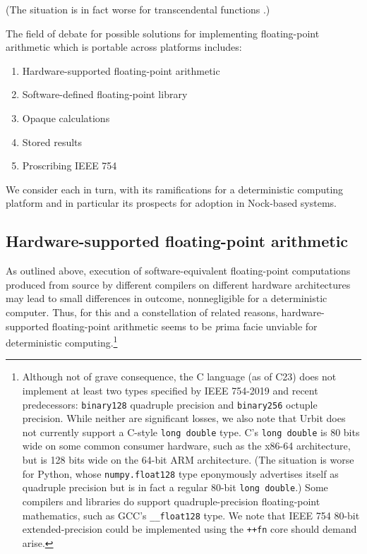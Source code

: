 \documentclass[twoside]{article}
\begin{document}
(The situation is in fact worse for transcendental functions \citep{Dawson2013}.)

The field of debate for possible solutions for implementing floating-point arithmetic which is portable across platforms includes:

\begin{enumerate}
  \item  Hardware-supported floating-point arithmetic
  \item  Software-defined floating-point library
  \item  Opaque calculations
  \item  Stored results
  \item  Proscribing IEEE 754
\end{enumerate}

We consider each in turn, with its ramifications for a deterministic computing platform and in particular its prospects for adoption in Nock-based systems.

\subsection{Hardware-supported floating-point arithmetic}

As outlined above, execution of software-equivalent floating-point computations produced from source by different compilers on different hardware architectures may lead to small differences in outcome, nonnegligible for a deterministic computer.  Thus, for this and a constellation of related reasons, hardware-supported floating-point arithmetic seems to be {\emph prima facie} unviable for deterministic computing.\footnote{Although not of grave consequence, the C language (as of C23) does not implement at least two types specified by IEEE 754-2019 and recent predecessors:  \texttt{binary128} quadruple precision and \texttt{binary256} octuple precision.  While neither are significant losses, we also note that Urbit does not currently support a C-style \texttt{long double} type.  C's \texttt{long double} is 80 bits wide on some common consumer hardware, such as the x86-64 architecture, but is 128 bits wide on the 64-bit ARM architecture.  (The situation is worse for Python, whose \texttt{numpy.float128} type eponymously advertises itself as quadruple precision but is in fact a regular 80-bit \texttt{long double}.)  Some compilers and libraries do support quadruple-precision floating-point mathematics, such as GCC's \texttt{__float128} type.  We note that IEEE 754 80-bit extended-precision could be implemented using the \texttt{++fn} core should demand arise.}
\end{document}
